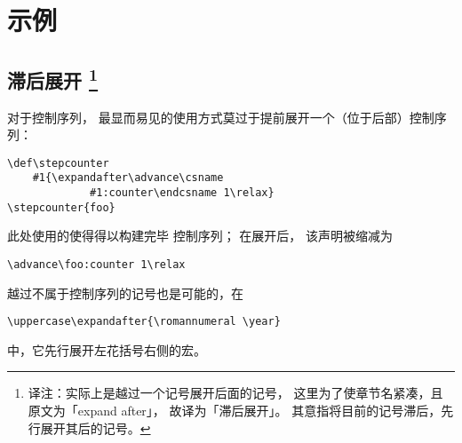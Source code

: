 \documentclass{book}
\begin{document}
\section{示例}

\subsection{滞后展开
\footnote{译注：实际上是越过一个记号展开后面的记号，
这里为了使章节名紧凑，且原文为「expand after」，
故译为「滞后展开」。
其意指将目前的记号滞后，先行展开其后的记号。}}

对于控制序列，
最显而易见的使用方式莫过于提前展开一个（位于后部）控制序列：
\begin{verbatim}
\def\stepcounter
    #1{\expandafter\advance\csname 
             #1:counter\endcsname 1\relax}
\stepcounter{foo}
\end{verbatim}
此处使用的使得得以构建完毕
控制序列；
在展开后，
该声明被缩减为
\begin{verbatim}
\advance\foo:counter 1\relax
\end{verbatim}
越过不属于控制序列的记号也是可能的，在
\begin{verbatim}
\uppercase\expandafter{\romannumeral \year}
\end{verbatim}
中，它先行展开左花括号右侧的宏。
\end{document}
